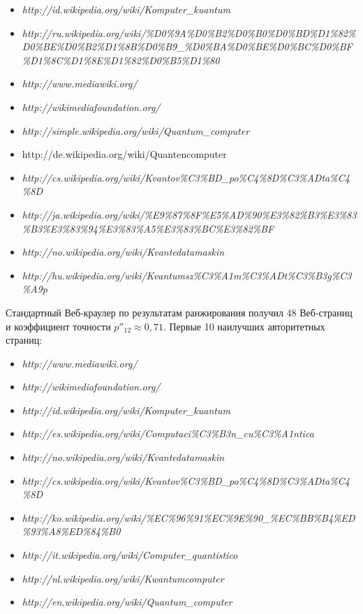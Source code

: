 \begin{itemize}
	\item \textit{http://id.wikipedia.org/wiki/Komputer\_kuantum}
	\item \textit{http://ru.wikipedia.org/wiki/\%D0\%9A\%D0\%B2\%D0\%B0\%D0\%BD\linebreak\%D1\%82\%D0\%BE\%D0\%B2\%D1\%8B\%D0\%B9\_\%D0\%BA\%D0\%BE\linebreak\%D0\%BC\%D0\%BF\%D1\%8C\%D1\%8E\%D1\%82\%D0\%B5\%D1\%80}
	\item \textit{http://www.mediawiki.org/} 
	\item \textit{http://wikimediafoundation.org/}
	\item \textit{http://simple.wikipedia.org/wiki/Quantum\_computer}
	\item http://de.wikipedia.org/wiki/Quantencomputer 
	\item \textit{http://cs.wikipedia.org/wiki/Kvantov\linebreak\%C3\%BD\_po\%C4\%8D\%C3\%ADta\%C4\%8D}
	\item \textit{http://ja.wikipedia.org/wiki/\%E9\%87\%8F\%E5\%AD\%90\%E3\%82\linebreak\%B3\%E3\%83\%B3\%E3\%83\%94\%E3\%83\%A5\%E3\%83\%BC\%E3\%82\%BF}
	\item \textit{http://no.wikipedia.org/wiki/Kvantedatamaskin}
	\item \textit{http://hu.wikipedia.org/wiki/Kvantumsz\linebreak\%C3\%A1m\%C3\%ADt\%C3\%B3g\%C3\%A9p}
\end{itemize}

Стандартный Веб-краулер по результатам ранжирования получил 48 Веб-страниц и коэффициент точности \(p''_{12} \approx 0,71\). Первые 10 наилучших авторитетных страниц:

\begin{itemize}
	\item \textit{http://www.mediawiki.org/} 
	\item \textit{http://wikimediafoundation.org/}
	\item \textit{http://id.wikipedia.org/wiki/Komputer\_kuantum}
	\item \textit{http://es.wikipedia.org/wiki/Computaci\%C3\%B3n\_cu\%C3\%A1ntica}
	\item \textit{http://no.wikipedia.org/wiki/Kvantedatamaskin}
	\item \textit{http://cs.wikipedia.org/wiki/Kvantov\linebreak\%C3\%BD\_po\%C4\%8D\%C3\%ADta\%C4\%8D}
	\item \textit{http://ko.wikipedia.org/wiki/\%EC\%96\%91\linebreak\%EC\%9E\%90\_\%EC\%BB\%B4\%ED\%93\%A8\%ED\%84\%B0}
	\item \textit{http://it.wikipedia.org/wiki/Computer\_quantistico}
	\item \textit{http://nl.wikipedia.org/wiki/Kwantumcomputer}
	\item \textit{http://en.wikipedia.org/wiki/Quantum\_computer}
\end{itemize}

